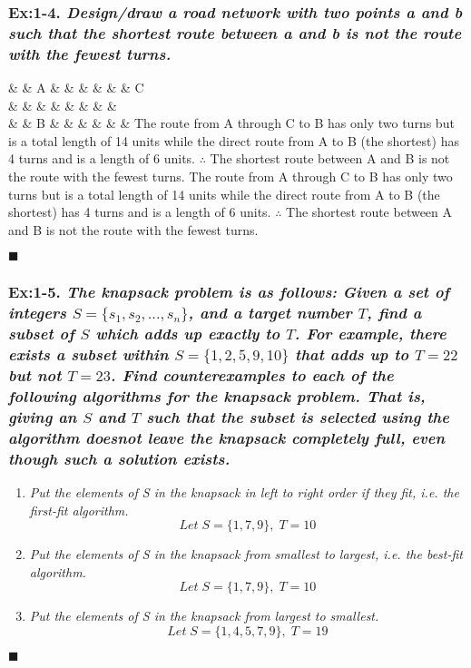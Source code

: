 \subsubsection*{\textbf{\enspace Ex:1-4.} \emph{Design/draw a road network with two points a and b such that the shortest route between a and b is not the route with the fewest turns.}}
\begin{solcen}
	{\&  \arrow[d, "1"] \& A \arrow[rrrrrr, "6"] \arrow[l, "1"] \&  \&  \&  \&  \&  \& C \arrow[dd, "2"] \\
	\arrow[d, "1"] \&  \arrow[l, "1"] \&  \&  \&  \&  \&  \&  \&  \\
	\arrow[rr, "2"] \&  \& B \&  \&  \&  \&  \&  \&  \arrow[llllll, "6"]}
%
	{The route from A through C to B has only two turns but is a total length of 14 units while the direct route from A to B (the shortest) has 4 turns and is a length of 6 units. $\therefore$ The shortest route between A and B is not the route with the fewest turns. The route from A through C to B has only two turns but is a total length of 14 units while the direct route from A to B (the shortest) has 4 turns and is a length of 6 units. $\therefore$ The shortest route between A and B is not the route with the fewest turns.\\}
\end{solcen}
$\blacksquare$


\subsubsection*{\textbf{\enspace Ex:1-5.} \emph{\textbf{The knapsack problem is as follows:}} \emph{Given a set of integers $S = \{s_{1}, s_{2},...,s_{n}\}$,
and a target number $T$, find a subset of $S$ which adds up exactly to $T$. For example, there exists a subset within $S = \{1, 2, 5, 9, 10\}$ that adds up to $T = 22$ but not $T = 23$. Find counterexamples to each of the following algorithms for the knapsack problem. That is, giving an $S$ and $T$ such that the subset is selected using the algorithm doesnot leave the knapsack completely full, even though such a solution exists.}}
\begin{enumerate}[label=(\alph*)]\itemsep1pt\parskip0pt
	\item{\emph{Put the elements of S in the knapsack in left to right order if they fit, i.e. the first-fit algorithm.} \\
		\textcolor{answer}{
		 $$Let\;  S = \{1,7,9\}, \; T = 10$$
		}
	}
	\item{\emph{Put the elements of S in the knapsack from smallest to largest, i.e. the best-fit algorithm.} \\
		\textcolor{answer}{
		$$Let\;  S = \{1,7,9\}, \; T = 10$$
		}
	}
	\item{\emph{Put the elements of S in the knapsack from largest to smallest.} \\
		\textcolor{answer}{
		$$Let\;  S = \{1,4,5,7,9\}, \; T = 19$$
		}
	}
\end{enumerate}
$\blacksquare$


